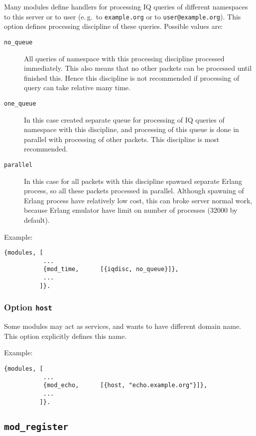 \documentclass[10pt]{article}
\newcommand{\modregister}{\texttt{mod\_register}}
\begin{document}
Many modules define handlers for processing IQ queries of different namespaces
to this server or to user (e.\,g.\ to \texttt{example.org} or to
\texttt{user@example.org}).  This option defines processing discipline of
these queries.  Possible values are:
\begin{description}
\item[\texttt{no\_queue}] All queries of namespace with this processing
  discipline processed immediately.  This also means that no other packets can
  be processed until finished this.  Hence this discipline is not recommended
  if processing of query can take relative many time.
\item[\texttt{one\_queue}] In this case created separate queue for processing
  of IQ queries of namespace with this discipline, and processing of this queue
  is done in parallel with processing of other packets. This discipline is most
  recommended.
\item[\texttt{parallel}] In this case for all packets with this discipline
  spawned separate Erlang process, so all these packets processed in parallel.
  Although spawning of Erlang process have relatively low cost, this can broke
  server normal work, because Erlang emulator have limit on number of processes
  (32000 by default).
\end{description}

Example:
\begin{verbatim}
{modules, [
           ...
           {mod_time,      [{iqdisc, no_queue}]},
           ...
          ]}.
\end{verbatim}


\subsubsection{Option \texttt{host}}

Some modules may act as services, and wants to have different domain name.
This option explicitly defines this name.

Example:
\begin{verbatim}
{modules, [
           ...
           {mod_echo,      [{host, "echo.example.org"}]},
           ...
          ]}.
\end{verbatim}



\subsection{\modregister{}}
\label{sec:modregister}
\end{document}
